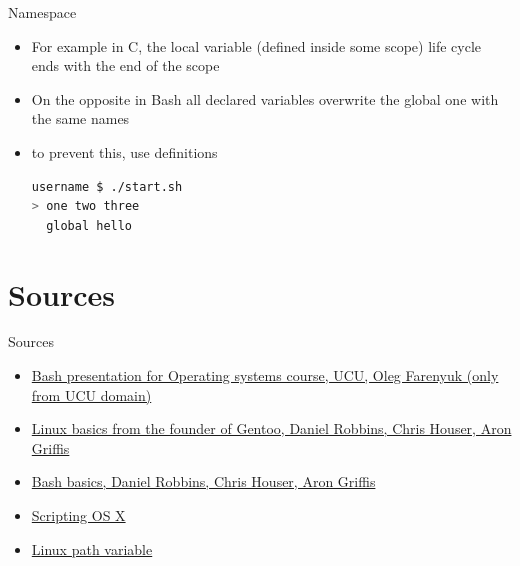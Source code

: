 \documentclass[usenames,dvipsnames,10pt,aspectratio=169]{beamer}
\begin{document}
\begin{frame}[fragile]{Namespace}
    \begin{itemize}
        \item For example in C, the local variable (defined inside some scope) life cycle ends with the end of the scope
        \item On the opposite in Bash all declared variables overwrite the global one with the same names
        \item to prevent this, use  definitions
        
        \begin{lstlisting}[language=Bash, style=shellstyle]
username $ ./start.sh
> one two three 
  global hello\end{lstlisting}
    \end{itemize}
\end{frame}

\section{Sources}
\begin{frame}{Sources}
\begin{itemize}
    \item \href{https://cms.ucu.edu.ua/pluginfile.php/181565/mod_resource/content/3/os_p01_bash.pdf}{Bash presentation for Operating systems course, UCU, Oleg Farenyuk (only from UCU domain)}
    \item \href{https://www.funtoo.org/Linux_Fundamentals,_Part_1}{Linux basics from the founder of Gentoo, Daniel Robbins, Chris Houser, Aron Griffis}
    \item \href{https://www.funtoo.org/Bash_by_Example,_Part_1}{Bash basics, Daniel Robbins, Chris Houser, Aron Griffis}
    \item \href {https://scriptingosx.com/}{Scripting OS X}
    \item \href {https://www.baeldung.com/linux/path-variable}{Linux path variable}
\end{itemize}    
\end{frame}
\end{document}
